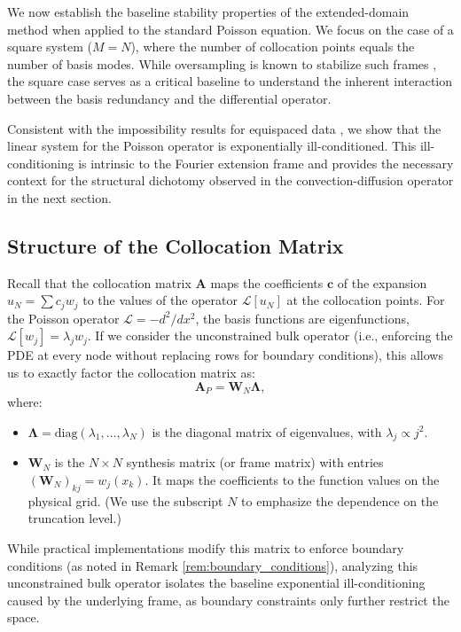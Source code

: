 \documentclass[pdflatex,sn-mathphys-num]{sn-jnl}%
\theoremstyle{thmstyleone}%
\newcommand{\mat}[1]{\mathbf{#1}}
\newcommand{\vect}[1]{\mathbf{#1}}
\begin{document}
We now establish the baseline stability properties of the extended-domain method when applied to the standard Poisson equation. We focus on the case of a square system ($M=N$), where the number of collocation points equals the number of basis modes. While oversampling is known to stabilize such frames \cite{adcock2014numerical}, the square case serves as a critical baseline to understand the inherent interaction between the basis redundancy and the differential operator.

Consistent with the impossibility results for equispaced data \cite{platte2011impossibility}, we show that the linear system for the Poisson operator is exponentially ill-conditioned. This ill-conditioning is intrinsic to the Fourier extension frame and provides the necessary context for the structural dichotomy observed in the convection-diffusion operator in the next section.

\subsection{Structure of the Collocation Matrix}

Recall that the collocation matrix $\mat{A}$ maps the coefficients $\vect{c}$ of the expansion $u_N = \sum c_j w_j$ to the values of the operator $\mathcal{L}[u_N]$ at the collocation points. For the Poisson operator $\mathcal{L} = -d^2/dx^2$, the basis functions are eigenfunctions, $\mathcal{L}[w_j] = \lambda_j w_j$. If we consider the unconstrained bulk operator (i.e., enforcing the PDE at every node without replacing rows for boundary conditions), this allows us to exactly factor the collocation matrix as:
\begin{equation}
\label{eq:poisson_factorization}
\mat{A}_P = \mat{W}_N \mathbf{\Lambda},
\end{equation}
where:
\begin{itemize}
    \item $\mathbf{\Lambda} = \text{diag}(\lambda_1, \dots, \lambda_N)$ is the diagonal matrix of eigenvalues, with $\lambda_j \propto j^2$.
    \item $\mat{W}_N$ is the $N \times N$ synthesis matrix (or frame matrix) with entries $(\mat{W}_N)_{kj} = w_j(x_k)$. It maps the coefficients to the function values on the physical grid. (We use the subscript $N$ to emphasize the dependence on the truncation level.)
\end{itemize}
While practical implementations modify this matrix to enforce boundary conditions (as noted in Remark \ref{rem:boundary_conditions}), analyzing this unconstrained bulk operator isolates the baseline exponential ill-conditioning caused by the underlying frame, as boundary constraints only further restrict the space.
\end{document}
